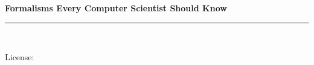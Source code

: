 \frontmatter

\begin{titlepage}
    \begin{flushleft}

    \textbf{\fontsize{48}{54}\selectfont Formalisms Every Computer Scientist Should Know\\}

    \par\noindent\rule{\textwidth}{4pt}\\

    \vspace{\fill}

    \end{flushleft}
    \begin{flushleft}
        \vspace{\fill}
        License: \booklicense
    \end{flushleft}
\end{titlepage}

\setcounter{tocdepth}{3}
\tableofcontents


